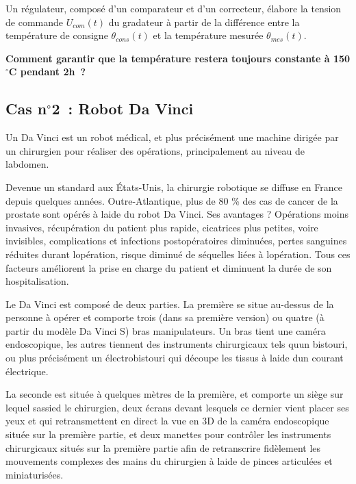 Un régulateur, composé d'un comparateur et d'un correcteur, élabore la
tension de commande \(U_{com}(t)\) du gradateur à partir de la
différence entre la température de consigne \(\theta_{cons}(t)\) et la
température mesurée \(\theta_{mes}(t)\).

\textbf{Comment garantir que la température restera toujours constante à
150$^\circ$C pendant 2h~?}

\subsection[Cas n$^\circ$2~: Robot Da
Vinci]{Cas n$^\circ$2~: Robot Da Vinci}\label{cas-n2-robot-da-vinci}

Un Da Vinci est un robot médical, et plus précisément une machine
dirigée par un chirurgien pour réaliser des opérations, principalement
au niveau de l\textquotesingle abdomen.

Devenue un standard aux États-Unis, la chirurgie robotique se diffuse en
France depuis quelques années. Outre-Atlantique, plus de 80 \% des cas
de cancer de la prostate sont opérés à l\textquotesingle aide du robot
Da Vinci. Ses avantages ? Opérations moins invasives, récupération du
patient plus rapide, cicatrices plus petites, voire invisibles,
complications et infections postopératoires diminuées, pertes sanguines
réduites durant l\textquotesingle opération, risque diminué de séquelles
liées à l\textquotesingle opération. Tous ces facteurs améliorent la
prise en charge du patient et diminuent la durée de son hospitalisation.

Le Da Vinci est composé de deux parties. La première se situe au-dessus
de la personne à opérer et comporte trois (dans sa première version) ou
quatre (à partir du modèle Da Vinci S) bras manipulateurs. Un bras tient
une caméra endoscopique, les autres tiennent des instruments
chirurgicaux tels qu\textquotesingle un bistouri, ou plus précisément un
électrobistouri qui découpe les tissus à l\textquotesingle aide
d\textquotesingle un courant électrique.

La seconde est située à quelques mètres de la première, et comporte un
siège sur lequel s\textquotesingle assied le chirurgien, deux écrans
devant lesquels ce dernier vient placer ses yeux et qui retransmettent
en direct la vue en 3D de la caméra endoscopique située sur la première
partie, et deux manettes pour contrôler les instruments chirurgicaux
situés sur la première partie afin de retranscrire fidèlement les
mouvements complexes des mains du chirurgien à l\textquotesingle aide de
pinces articulées et miniaturisées.

